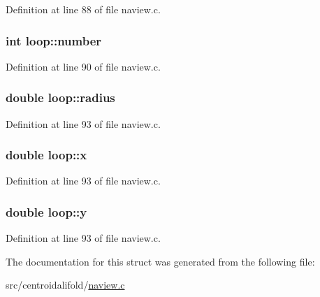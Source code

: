 Definition at line 88 of file naview.\+c.

\hypertarget{structloop_a7a839c1fed29a1dc9f486ec13b21bf99}{
\subsubsection[{number}]{\setlength{\rightskip}{0pt plus 5cm}int loop\+::number}}\label{structloop_a7a839c1fed29a1dc9f486ec13b21bf99}


Definition at line 90 of file naview.\+c.

\hypertarget{structloop_aac247baea3825b6d13f2021b86460602}{
\subsubsection[{radius}]{\setlength{\rightskip}{0pt plus 5cm}double loop\+::radius}}\label{structloop_aac247baea3825b6d13f2021b86460602}


Definition at line 93 of file naview.\+c.

\hypertarget{structloop_a83c555340d33764a979b7311888c6646}{
\subsubsection[{x}]{\setlength{\rightskip}{0pt plus 5cm}double loop\+::x}}\label{structloop_a83c555340d33764a979b7311888c6646}


Definition at line 93 of file naview.\+c.

\hypertarget{structloop_a46d7ddb88254dfc2ca248db8dd2a3680}{
\subsubsection[{y}]{\setlength{\rightskip}{0pt plus 5cm}double loop\+::y}}\label{structloop_a46d7ddb88254dfc2ca248db8dd2a3680}


Definition at line 93 of file naview.\+c.



The documentation for this struct was generated from the following file\+:\begin{DoxyCompactItemize}
\item 
src/centroidalifold/\hyperlink{naview_8c}{naview.\+c}\end{DoxyCompactItemize}
